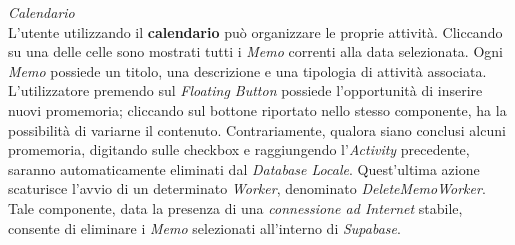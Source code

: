 \documentclass{article}
\begin{document}
    \textit{Calendario} \vspace*{7pt}\\
    L'utente utilizzando il \textbf{calendario} può organizzare le proprie attività. Cliccando su una delle celle sono mostrati tutti i \textit{Memo} correnti alla data selezionata.
    Ogni \textit{Memo} possiede un titolo, una descrizione e una tipologia di attività associata. L'utilizzatore premendo sul \textit{Floating Button} possiede l'opportunità di inserire nuovi promemoria; cliccando sul bottone riportato nello stesso componente, ha la possibilità di variarne il contenuto. Contrariamente, qualora siano conclusi alcuni
    promemoria, digitando sulle checkbox e raggiungendo l'\textit{Activity} precedente, saranno automaticamente eliminati dal \textit{Database Locale}.
    Quest'ultima azione scaturisce l'avvio di un determinato \textit{Worker}, denominato \textit{DeleteMemoWorker}. Tale componente, data la presenza di una \textit{connessione ad Internet} stabile, consente di eliminare i \textit{Memo} selezionati all'interno di \textit{Supabase}.
    \begin{center}
        \begin{figure}[H]
            \centering
        \end{figure}
    \end{center}
\end{document}
